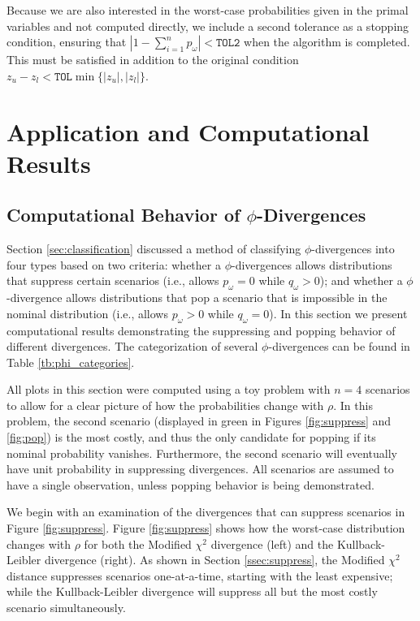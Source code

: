 \documentclass[ijoc,nonblindrev]{informs3} %
\begin{document}
Because we are also interested in the worst-case probabilities given in the primal variables and not computed directly, we include a second tolerance as a stopping condition, ensuring that $\left| 1 - \sum_{i=1}^n p_\omega \right| < \texttt{TOL2}$ when the algorithm is completed.
This must be satisfied in addition to the original condition $z_u - z_l < \texttt{TOL}\min\{|z_u|,|z_l|\}$.

\section{Application and Computational Results} \label{sec:comp_results}

\subsection{Computational Behavior of $\phi$-Divergences}
\label{ssec:computational_classification}

Section \ref{sec:classification} discussed a method of classifying $\phi$-divergences into four types based on two criteria: whether a $\phi$-divergences allows distributions that suppress certain scenarios (i.e., allows $p_\omega = 0$ while $q_\omega > 0$); and whether a $\phi$-divergence allows distributions that pop a scenario that is impossible in the nominal distribution (i.e., allows $p_\omega > 0$ while $q_\omega = 0$).
In this section we present computational results demonstrating the suppressing and popping behavior of different divergences.
The categorization of several $\phi$-divergences can be found in Table \ref{tb:phi_categories}.

All plots in this section were computed using a toy problem with $n = 4$ scenarios to allow for a clear picture of how the probabilities change with $\rho$.
In this problem, the second scenario (displayed in green in Figures \ref{fig:suppress} and \ref{fig:pop}) is the most costly, and thus the only candidate for popping if its nominal probability vanishes.
Furthermore, the second scenario will eventually have unit probability in suppressing divergences.
All scenarios are assumed to have a single observation, unless popping behavior is being demonstrated.

We begin with an examination of the divergences that can suppress scenarios in Figure \ref{fig:suppress}.
Figure \ref{fig:suppress} shows how the worst-case distribution changes with $\rho$ for both the Modified $\chi^2$ divergence (left) and the Kullback-Leibler divergence (right).
As shown in Section \ref{ssec:suppress}, the Modified $\chi^2$ distance suppresses scenarios one-at-a-time, starting with the least expensive; while the Kullback-Leibler divergence will suppress all but the most costly scenario simultaneously.
\end{document}
